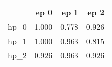 \begin{tabular}{lrrr}
\toprule
{} &   ep 0 &   ep 1 &   ep 2 \\
\midrule
hp\_0 &  1.000 &  0.778 &  0.926 \\
hp\_1 &  1.000 &  0.963 &  0.815 \\
hp\_2 &  0.926 &  0.963 &  0.926 \\
\bottomrule
\end{tabular}
